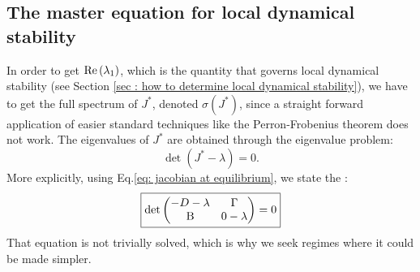 \documentclass[12pt, titlepage]{report}
\begin{document}
\subsection{The master equation for local dynamical stability}\label{sec : establish master equation for dynamical stability}
In order to get $\text{Re}\left(\lambda_1\right)$, which is the quantity that governs local dynamical stability (see Section \ref{sec : how to determine local dynamical stability}), we have to get the full spectrum of $J^*$, denoted $\sigma(J^*)$, since a straight forward application of easier standard techniques like the Perron-Frobenius theorem \cite{perron_zur_nodate} does not work. The eigenvalues of $J^*$ are obtained through the eigenvalue problem:
\begin{equation}
\det\left(J^* - \lambda \right) = 0.
\end{equation}
More explicitly, using Eq.\eqref{eq: jacobian at equilibrium}, we state the :
\begin{equation}
\boxed{
\det
\begin{pmatrix}
 -D - \lambda  & \Gamma \\
 \text{B} & 0-\lambda
\end{pmatrix} = 0
}
\end{equation}
That equation is not trivially solved, which is why we seek regimes where it could be made simpler.
\end{document}
